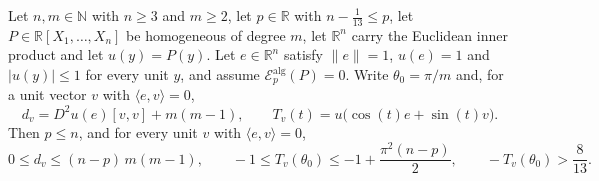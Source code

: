\begin{lemma}
Let $n,m\in\mathbb{N}$ with $n\ge3$ and $m\ge2$, let $p\in\mathbb{R}$ with
$n-\tfrac1{13}\le p$, let $P\in\mathbb{R}[X_1,\dots,X_n]$ be homogeneous of
degree $m$, let $\mathbb{R}^n$ carry the Euclidean inner product and let
$u(y)=P(y)$. Let $e\in\mathbb{R}^n$ satisfy $\lVert e\rVert=1$, $u(e)=1$ and
$\lvert u(y)\rvert\le1$ for every unit $y$, and assume
$\mathcal{E}^{\mathrm{alg}}_p(P)=0$. Write $\theta_0=\pi/m$ and, for a unit
vector $v$ with $\langle e,v\rangle=0$,
\[
  d_v=D^2u(e)[v,v]+m(m-1),
  \qquad
  T_v(t)=u\bigl(\cos(t)e+\sin(t)v\bigr).
\]
Then $p\le n$, and for every unit $v$ with $\langle e,v\rangle=0$,
\[
  0\le d_v\le(n-p)\,m(m-1),
  \qquad
  -1\le T_v(\theta_0)\le-1+\frac{\pi^2(n-p)}{2},
  \qquad
  -T_v(\theta_0)>\frac8{13}.
\]
\end{lemma}
